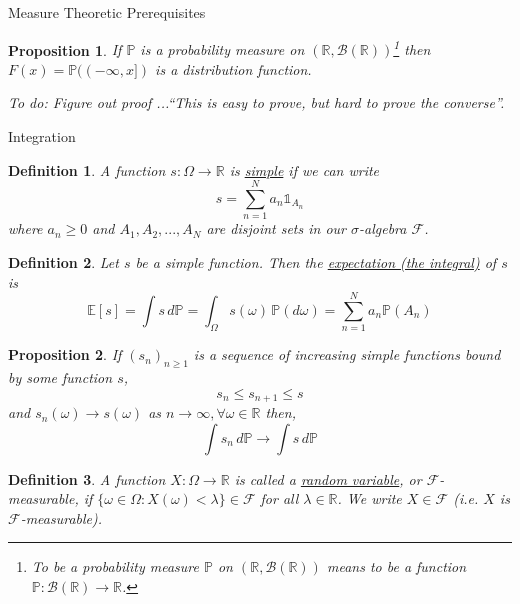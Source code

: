 \documentclass[12pt]{article}
\newtheorem{definition}{Definition}
\newtheorem{proposition}{Proposition}
\begin{document}
\begin{section}{Measure Theoretic Prerequisites}
\begin{proposition} If $\mathbb P$ is a probability measure on $(\mathbb R, \mathcal B(\mathbb R))$\footnote{To be a probability measure $\mathbb P$ on $(\mathbb R, \mathcal B(\mathbb R))$ means to be a function $\mathbb P:\mathcal B(\mathbb R) \rightarrow \mathbb R$.}   then $F(x) = \mathbb P((-\infty, x])$ is a distribution function.

To do: Figure out proof ...``This is easy to prove, but hard to prove the converse''.
\end{proposition}

\end{section}

\begin{section}{Integration}

\begin{definition} \label{def:simplefxn} A function $s:\Omega \rightarrow \mathbb R$ is \underline{simple} if we can write
\begin{equation*}
	s = \sum^N_{n = 1} a_n \mathds 1_{A_n}
\end{equation*}
where $a_n \geq 0$ and $A_1, A_2, ..., A_N$ are disjoint sets in our $\sigma$-algebra $\mathcal F$.
\end{definition}

\begin{definition} \label{def:expectation} Let $s$ be a simple function. Then the \underline{expectation (the integral)} of $s$ is
\begin{equation*}
	\mathbb E[s] = \int s\,d\mathbb P = \int_\Omega s(\omega)\,\mathbb P(d\omega) = \sum^N_{n = 1} a_n \mathbb P(A_n)
\end{equation*}
\end{definition}

\begin{proposition} If $(s_n)_{n\geq1}$ is a sequence of increasing simple functions bound by some function $s$,
\begin{equation*}
	s_n \leq s_{n+1} \leq s
\end{equation*}
and $s_n(\omega) \longrightarrow s(\omega)$ as $n \longrightarrow \infty, \forall \omega \in \mathbb R$ then,
\begin{equation*}
	\int s_n\,d\mathbb P \longrightarrow \int s\,d\mathbb P
\end{equation*}
\end{proposition}

\begin{definition} \label{def:randomvar} A function $X: \Omega \rightarrow \mathbb R$ is called a \underline{random variable}, or $\mathcal F$-measurable, if $\{\omega \in \Omega: X(\omega) < \lambda\} \in \mathcal F$ for all $\lambda \in \mathbb R$. We write $X \in \mathcal F$ (i.e. $X$ is $\mathcal F$-measurable).
\end{definition}


\end{section}
\end{document}
